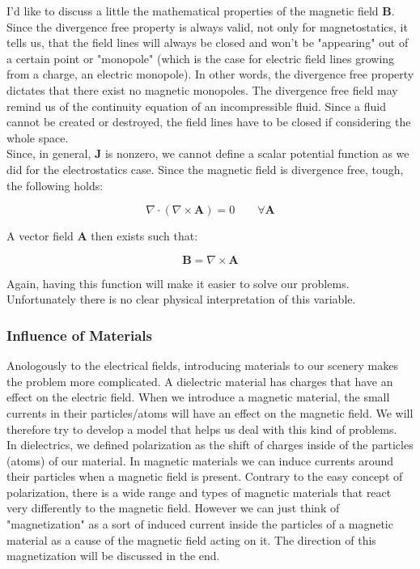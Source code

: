 I'd like to discuss a little the mathematical properties of the magnetic field $\textbf{B}$. Since the divergence free property is always valid, not only for magnetostatics, it tells us, that the field lines will always be closed and won't be "appearing" out of a certain point or "monopole" (which is the case for electric field lines growing from a charge, an electric monopole). In other words, the divergence free property dictates that there exist no magnetic monopoles. The divergence free field may remind us of the continuity equation of an incompressible fluid. Since a fluid cannot be created or destroyed, the field lines have to be closed if considering the whole space.\\

Since, in general, $\textbf{J}$ is nonzero, we cannot define a scalar potential function as we did for the electrostatics case. Since the magnetic field is divergence free, tough, the following holds:

\begin{equation}
\nabla\cdot(\nabla\times\textbf{A})  =0 \qquad \forall \textbf{A}
\end{equation}

A vector field $\textbf{A}$ then exists such that:

\begin{equation}
\textbf{B} = \nabla \times \textbf{A}
\end{equation}

Again, having this function will make it easier to solve our problems. Unfortunately there is no clear physical interpretation of this variable.\\

\subsubsection{Influence of Materials}

Anologously to the electrical fields, introducing materials to our scenery makes the problem more complicated. A dielectric material has charges that have an effect on the electric field. When we introduce a magnetic material, the small currents in their particles/atoms will have an effect on the magnetic field. We will therefore try to develop a model that helps us deal with this kind of problems.\\

In dielectrics, we defined polarization as the shift of charges inside of the particles (atoms) of our material. In magnetic materials we can induce currents around their particles when a magnetic field is present. Contrary to the easy concept of polarization, there is a wide range and types of magnetic materials that react very differently to the magnetic field. However we can just think of "magnetization" as a sort of induced current inside the particles of a magnetic material as a cause of the magnetic field acting on it. The direction of this magnetization will be discussed in the end.\\

